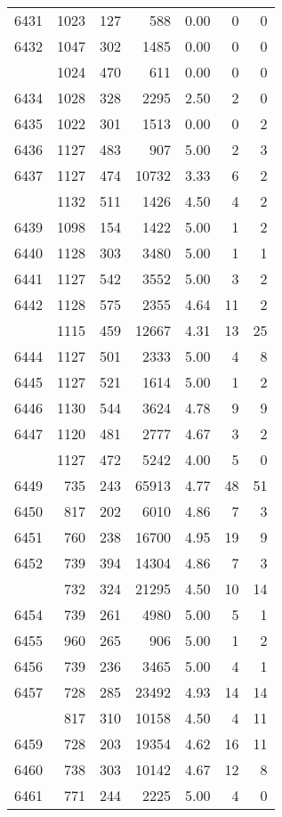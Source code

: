 \documentclass[
]{article}
\begin{document}
\begin{table}
\begin{tabular}[t]{lrrrrrr}
6431 & 1023 & 127 & 588 & 0.00 & 0 & 0\\
6432 & 1047 & 302 & 1485 & 0.00 & 0 & 0\\
\addlinespace
6433 & 1024 & 470 & 611 & 0.00 & 0 & 0\\
6434 & 1028 & 328 & 2295 & 2.50 & 2 & 0\\
6435 & 1022 & 301 & 1513 & 0.00 & 0 & 2\\
6436 & 1127 & 483 & 907 & 5.00 & 2 & 3\\
6437 & 1127 & 474 & 10732 & 3.33 & 6 & 2\\
\addlinespace
6438 & 1132 & 511 & 1426 & 4.50 & 4 & 2\\
6439 & 1098 & 154 & 1422 & 5.00 & 1 & 2\\
6440 & 1128 & 303 & 3480 & 5.00 & 1 & 1\\
6441 & 1127 & 542 & 3552 & 5.00 & 3 & 2\\
6442 & 1128 & 575 & 2355 & 4.64 & 11 & 2\\
\addlinespace
6443 & 1115 & 459 & 12667 & 4.31 & 13 & 25\\
6444 & 1127 & 501 & 2333 & 5.00 & 4 & 8\\
6445 & 1127 & 521 & 1614 & 5.00 & 1 & 2\\
6446 & 1130 & 544 & 3624 & 4.78 & 9 & 9\\
6447 & 1120 & 481 & 2777 & 4.67 & 3 & 2\\
\addlinespace
6448 & 1127 & 472 & 5242 & 4.00 & 5 & 0\\
6449 & 735 & 243 & 65913 & 4.77 & 48 & 51\\
6450 & 817 & 202 & 6010 & 4.86 & 7 & 3\\
6451 & 760 & 238 & 16700 & 4.95 & 19 & 9\\
6452 & 739 & 394 & 14304 & 4.86 & 7 & 3\\
\addlinespace
6453 & 732 & 324 & 21295 & 4.50 & 10 & 14\\
6454 & 739 & 261 & 4980 & 5.00 & 5 & 1\\
6455 & 960 & 265 & 906 & 5.00 & 1 & 2\\
6456 & 739 & 236 & 3465 & 5.00 & 4 & 1\\
6457 & 728 & 285 & 23492 & 4.93 & 14 & 14\\
\addlinespace
6458 & 817 & 310 & 10158 & 4.50 & 4 & 11\\
6459 & 728 & 203 & 19354 & 4.62 & 16 & 11\\
6460 & 738 & 303 & 10142 & 4.67 & 12 & 8\\
6461 & 771 & 244 & 2225 & 5.00 & 4 & 0\\

\end{tabular}
\end{table}
\end{document}
